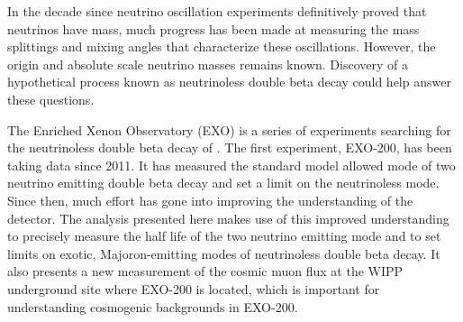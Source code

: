 In the decade since neutrino oscillation experiments definitively proved that neutrinos have mass, much progress has been made at measuring the mass splittings and mixing angles that characterize these oscillations. However, the origin and absolute scale neutrino masses remains known. Discovery of a hypothetical process known as neutrinoless double beta decay could help answer these questions.

The Enriched Xenon Observatory (EXO) is a series of experiments searching for the neutrinoless double beta decay of . The first experiment, EXO-200, has been taking data since 2011. It has measured the standard model allowed mode of two neutrino emitting double beta decay and set a limit on the neutrinoless mode. Since then, much effort has gone into improving the understanding of the detector. The analysis presented here makes use of this improved understanding to precisely measure the half life of the two neutrino emitting mode and to set limits on exotic, Majoron-emitting modes of neutrinoless double beta decay. It also presents a new measurement of the cosmic muon flux at the WIPP underground site where EXO-200 is located, which is important for understanding cosmogenic backgrounds in EXO-200.

